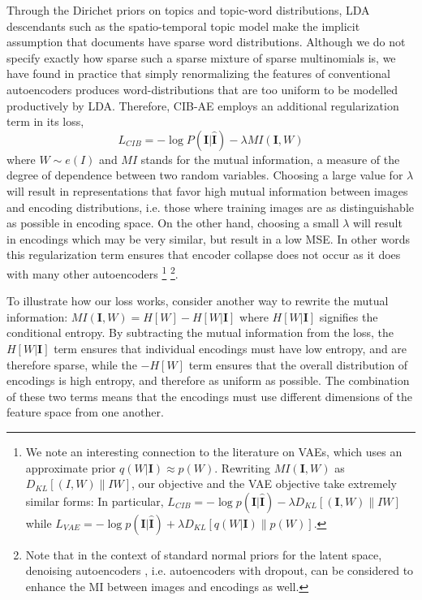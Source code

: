 Through the Dirichet priors on topics and topic-word distributions, LDA descendants such as the spatio-temporal topic model make the implicit assumption that documents have sparse word distributions. Although we do not specify exactly how sparse such a sparse mixture of sparse multinomials is, we have found in practice that simply renormalizing the features of conventional autoencoders produces word-distributions that are too uniform to be modelled productively by LDA. Therefore, CIB-AE employs an additional regularization term in its loss,
\begin{equation}
    L_{CIB} = -\log P(\mathbf{I} | \mathbf{\hat{I}}) - \lambda MI\left(\mathbf{I}, W\right)
\end{equation}
where $W \sim e(I)$ and $MI$ stands for the mutual information, a measure of the degree of dependence between two random variables. Choosing a large value for $\lambda$ will result in representations that favor high mutual information between images and encoding distributions, i.e. those where training images are as distinguishable as possible in encoding space. On the other hand, choosing a small $\lambda$ will result in encodings which may be very similar, but result in a low MSE. In other words this regularization term ensures that encoder collapse does not occur as it does with many other autoencoders \footnote{We note an interesting connection to the literature on VAEs, which uses an approximate prior $q(W|\mathbf{I}) \approx p(W)$. Rewriting $MI\left(\mathbf{I}, W\right)$ as $D_{KL}[(I,W) \| IW ]$, our objective and the VAE objective take extremely similar forms: In particular, $L_{CIB} = -\log p(\mathbf{I} | \mathbf{\hat{I}}) - \lambda D_{KL}[(\mathbf{I},W) \| IW ]$ while $L_{VAE} = -\log p(\mathbf{I} | \mathbf{\hat{I}}) + \lambda D_{KL}[q(W|\mathbf{I}) \| p(W) ]$.} \footnote{Note that in the context of standard normal priors for the latent space, denoising autoencoders \citep{vincent2010stacked}, i.e. autoencoders with dropout, can be considered to enhance the MI between images and encodings as well.}.

To illustrate how our loss works, consider another way to rewrite the mutual information: $ MI\left(\mathbf{I}, W\right) = H[W] - H[W | \mathbf{I}] $
where $H[W | \mathbf{I}]$ signifies the conditional entropy. By subtracting the mutual information from the loss, the $H[W | \mathbf{I}]$ term ensures that individual encodings must have low entropy, and are therefore sparse, while the $-H[W]$ term ensures that the overall distribution of encodings is high entropy, and therefore as uniform as possible. The combination of these two terms means that the encodings must use different dimensions of the feature space from one another.

